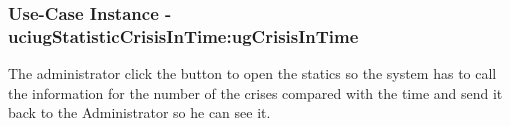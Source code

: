 
	\subsubsection{Use-Case Instance - uciugStatisticCrisisInTime:ugCrisisInTime}
	
	The administrator click the button to open the statics so the system has to call the information for the number of the crises compared with the time and send it back to the Administrator so he can see it. 		  
	\begin{operationmodel}
	
	\end{operationmodel} 

	
